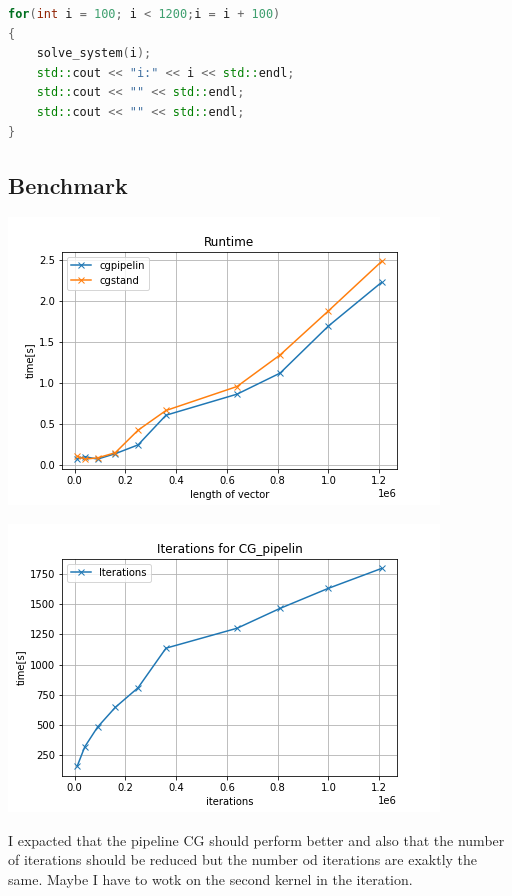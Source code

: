 \documentclass[11pt,a4paper]{article}
\begin{document}
\begin{lstlisting}[language=C++, caption={main}]
for(int i = 100; i < 1200;i = i + 100)
{
	solve_system(i); 
	std::cout << "i:" << i << std::endl;
	std::cout << "" << std::endl;
	std::cout << "" << std::endl;
}
\end{lstlisting}

\subsection*{Benchmark}
\begin{minipage}[t]{0.49\textwidth}
	\includegraphics[width=\textwidth]{Bilder/CG_pipelin.png}
\end{minipage}
\begin{minipage}[t]{0.49\textwidth}
	\includegraphics[width=\textwidth]{Bilder/iter.png}
\end{minipage}

\noindent
I expacted that the pipeline CG should perform better and also that the number of iterations should be reduced but the number od iterations are exaktly the same. Maybe I have to wotk on the second kernel in the iteration.
\end{document}
